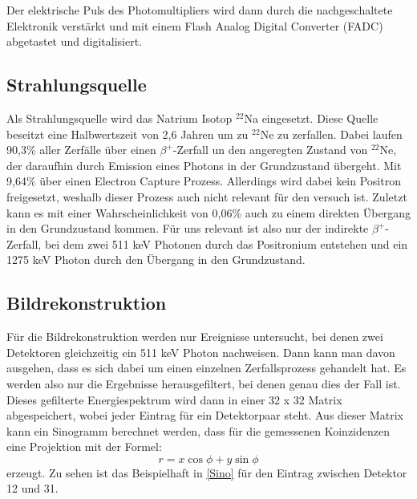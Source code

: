 Der elektrische Puls des Photomultipliers wird dann durch die nachgeschaltete Elektronik verstärkt und mit einem Flash Analog Digital Converter (FADC) abgetastet und digitalisiert.

\subsection{Strahlungsquelle}
Als Strahlungsquelle wird das Natrium Isotop $^{22}$Na eingesetzt. Diese Quelle beseitzt eine Halbwertszeit von 2,6 Jahren um zu $^{22}$Ne zu zerfallen. Dabei laufen 90,3\% aller Zerfälle über einen $\beta^{+}$-Zerfall un den angeregten Zustand von $^{22}$Ne, der daraufhin durch Emission eines Photons in der Grundzustand übergeht. Mit 9,64\% über einen Electron Capture Prozess. Allerdings wird dabei kein Positron freigesetzt, weshalb dieser Prozess auch nicht relevant für den versuch ist. Zuletzt kann es mit einer Wahrscheinlichkeit von 0,06\% auch zu einem direkten Übergang in den Grundzustand kommen. Für uns relevant ist also nur der indirekte $\beta^{+}$-Zerfall, bei dem zwei 511 keV Photonen durch das Positronium entstehen und ein 1275 keV Photon durch den Übergang in den Grundzustand.

\subsection{Bildrekonstruktion}
Für die Bildrekonstruktion werden nur Ereignisse untersucht, bei denen zwei Detektoren gleichzeitig ein 511 keV Photon nachweisen. Dann kann man davon ausgehen, dass es sich dabei um einen einzelnen Zerfallsprozess gehandelt hat. Es werden also nur die Ergebnisse herausgefiltert, bei denen genau dies der Fall ist. Dieses gefilterte Energiespektrum wird dann in einer 32 x 32 Matrix abgespeichert, wobei jeder Eintrag für ein Detektorpaar steht. Aus dieser Matrix kann ein Sinogramm berechnet werden, dass für die gemessenen Koinzidenzen eine Projektion mit der Formel:
\begin{equation}
	r = x \cos{\phi} + y \sin{\phi}
\end{equation}
erzeugt. Zu sehen ist das Beispielhaft in \cref{Sino} für den Eintrag zwischen Detektor 12 und 31.

